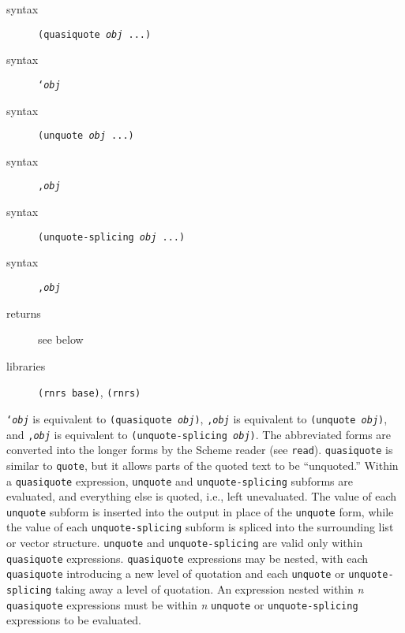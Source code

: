 \begin{description}

\label{objects_s5}\item[syntax] \texttt{(quasiquote \textit{obj} ...)}



\item[syntax] \texttt{`\textit{obj}}



\item[syntax] \texttt{(unquote \textit{obj} ...)}



\item[syntax] \texttt{,\textit{obj}}



\item[syntax] \texttt{(unquote-splicing \textit{obj} ...)}



\item[syntax] \texttt{,\@{}\textit{obj}}



\item[returns] see below
 

\item[libraries] \texttt{(rnrs base)}, \texttt{(rnrs)}
\end{description}

\texttt{`\textit{obj}} is equivalent to \texttt{(quasiquote \textit{obj})},
\texttt{,\textit{obj}} is equivalent to \texttt{(unquote \textit{obj})}, and
\texttt{,\@{}\textit{obj}} is equivalent to \texttt{(unquote-splicing \textit{obj})}.
The abbreviated forms are converted into the longer forms by the
Scheme reader (see \texttt{read}).
\texttt{quasiquote} is similar to \texttt{quote}, but it allows parts
of the quoted text to be ``unquoted.''
Within a \texttt{quasiquote} expression,
\texttt{unquote} and \texttt{unquote-splicing} subforms are evaluated,
and everything else is quoted, i.e., left unevaluated.
The value of each \texttt{unquote} subform is inserted into the output
in place of the \texttt{unquote} form, while the value of each
\texttt{unquote-splicing} subform is spliced into the surrounding list
or vector structure.
\texttt{unquote} and \texttt{unquote-splicing} are valid only within
\texttt{quasiquote} expressions.
\texttt{quasiquote} expressions may be nested, with each \texttt{quasiquote}
introducing a new level of quotation and each \texttt{unquote} or
\texttt{unquote-splicing} taking away a level of quotation.
An expression nested within \textit{n} \texttt{quasiquote} expressions must
be within \textit{n} \texttt{unquote} or \texttt{unquote-splicing} expressions to
be evaluated.

